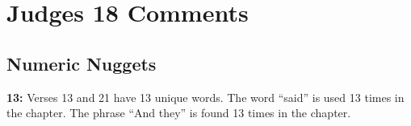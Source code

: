 \section{Judges 18 Comments}

\subsection{Numeric Nuggets}
\textbf{13: } Verses 13 and 21 have 13 unique words. The word ``said'' is used 13 times in the chapter. The phrase ``And they'' is found 13 times in the chapter.
